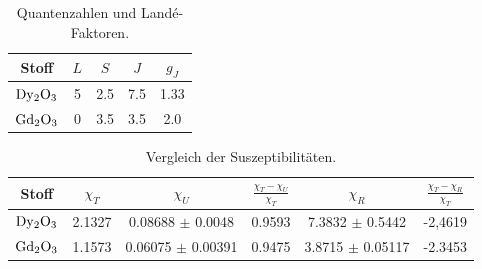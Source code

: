 \begin{table}
  \centering
  \caption{Quantenzahlen und Landé-Faktoren.}
  \begin{tabular}{c c c c c }
    \toprule
    {Stoff} & {$L$} & {$S$} & {$J$} & {$g_J$}\\
    \midrule
    $\ce{Dy2O3}$ & 5 & 2.5 & 7.5 & 1.33\\
    $\ce{Gd2O3}$ & 0 & 3.5 & 3.5 & 2.0\\
    \bottomrule
  \end{tabular}
\end{table}

\begin{table}
  \centering
  \caption{Vergleich der Suszeptibilitäten.}
  \begin{tabular}{c c c c c c}
    \toprule
    {Stoff} & {$\chi_T$} &{$\chi_U$} & {$\frac{\chi_T - \chi_U}{\chi_T}$} & {$\chi_R$} & {$\frac{\chi_T - \chi_R}{\chi_T}$}\\
    \midrule
    $\ce{Dy2O3}$ & 2.1327 & 0.08688 $\pm$ 0.0048 & 0.9593 & 7.3832 $\pm$ 0.5442&  -2,4619\\
    $\ce{Gd2O3}$ & 1.1573 &  0.06075 $\pm$  0.00391 & 0.9475 &3.8715 $\pm$ 0.05117 & -2.3453 \\
    \bottomrule
  \end{tabular}
\end{table}